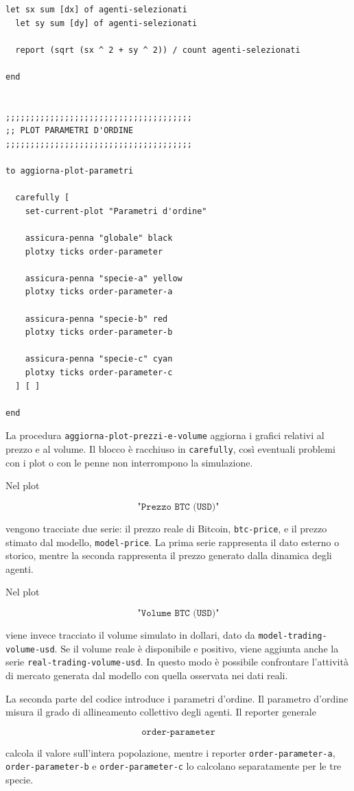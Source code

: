 \begin{lstlisting}[caption={Aggiornamento dei plot e calcolo dei parametri d'ordine}]
  let sx sum [dx] of agenti-selezionati
  let sy sum [dy] of agenti-selezionati

  report (sqrt (sx ^ 2 + sy ^ 2)) / count agenti-selezionati

end


;;;;;;;;;;;;;;;;;;;;;;;;;;;;;;;;;;;;;;
;; PLOT PARAMETRI D'ORDINE
;;;;;;;;;;;;;;;;;;;;;;;;;;;;;;;;;;;;;;

to aggiorna-plot-parametri

  carefully [
    set-current-plot "Parametri d'ordine"

    assicura-penna "globale" black
    plotxy ticks order-parameter

    assicura-penna "specie-a" yellow
    plotxy ticks order-parameter-a

    assicura-penna "specie-b" red
    plotxy ticks order-parameter-b

    assicura-penna "specie-c" cyan
    plotxy ticks order-parameter-c
  ] [ ]

end
\end{lstlisting}

La procedura \texttt{aggiorna-plot-prezzi-e-volume} aggiorna i grafici relativi
al prezzo e al volume. Il blocco è racchiuso in \texttt{carefully}, così eventuali
problemi con i plot o con le penne non interrompono la simulazione.

Nel plot

\[
\texttt{"Prezzo BTC (USD)"}
\]

vengono tracciate due serie: il prezzo reale di Bitcoin, \texttt{btc-price}, e il
prezzo stimato dal modello, \texttt{model-price}. La prima serie rappresenta il
dato esterno o storico, mentre la seconda rappresenta il prezzo generato dalla
dinamica degli agenti.

Nel plot

\[
\texttt{"Volume BTC (USD)"}
\]

viene invece tracciato il volume simulato in dollari, dato da
\texttt{model-trading-volume-usd}. Se il volume reale è disponibile e positivo,
viene aggiunta anche la serie \texttt{real-trading-volume-usd}. In questo modo è
possibile confrontare l'attività di mercato generata dal modello con quella
osservata nei dati reali.

La seconda parte del codice introduce i parametri d'ordine. Il parametro d'ordine
misura il grado di allineamento collettivo degli agenti. Il reporter generale

\[
\texttt{order-parameter}
\]

calcola il valore sull'intera popolazione, mentre i reporter
\texttt{order-parameter-a}, \texttt{order-parameter-b} e
\texttt{order-parameter-c} lo calcolano separatamente per le tre specie.

